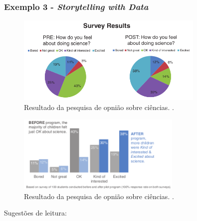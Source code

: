\begin{frame}[allowframebreaks=1]
\frametitle{Exemplo 3 - \emph{Storytelling with Data}}
\begin{figure}[h]
 \centering
 \includegraphics[width=0.8\textwidth,height=0.6\textheight,keepaspectratio]{figures/storytelling_data_ex03a.png}
 \caption{Resultado da pesquisa de opnião sobre ciências. \cite{knaflic_storytelling_2015}.}
 \label{fig-storytelling_data_ex03a}
\end{figure}
\framebreak
\begin{figure}[h]
 \centering
 \includegraphics[width=0.7\textwidth,height=0.6\textheight,keepaspectratio]{figures/storytelling_data_ex03b.png}
 \caption{Resultado da pesquisa de opnião sobre ciências. \cite{knaflic_storytelling_2015}.}
 \label{fig-storytelling_data_ex03b}
\end{figure}
\end{frame}



\begin{frame}
Sugestões de leitura: 
\vspace{2ex}

\vspace{2ex}

\vspace{2ex}

\vspace{2ex}

\end{frame}


